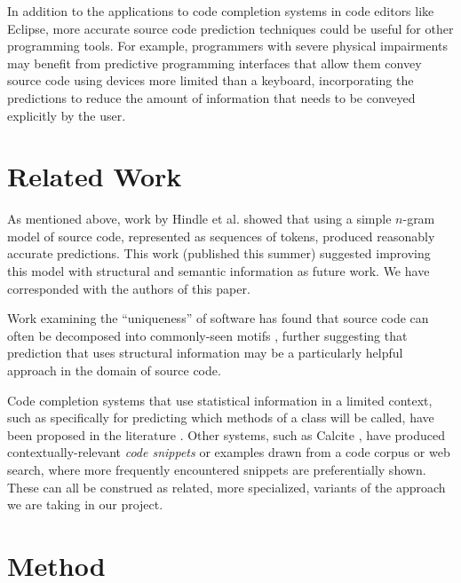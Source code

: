 \documentclass{article} %
\begin{document}
In addition to the applications to code completion systems in code editors like Eclipse, more accurate source code prediction techniques could be useful for other programming tools. For example, programmers with severe physical impairments may benefit from predictive programming interfaces that allow them convey source code using devices more limited than a keyboard, incorporating the predictions to reduce the amount of information that needs to be conveyed explicitly by the user.

\section*{Related Work}
As mentioned above, work by Hindle et al. \cite{Hindle:2012:NS:2337223.2337322} showed that using a simple $n$-gram model of source code, represented as sequences of tokens, produced reasonably accurate predictions. This work (published this summer) suggested improving this model with structural and semantic information as future work. We have corresponded with the authors of this paper.

Work examining the ``uniqueness'' of software has found that source code can often be decomposed into commonly-seen motifs \cite{Gabel:2010:FSE}, further suggesting that prediction that uses structural information may be a particularly helpful approach in the domain of source code.

Code completion systems that use statistical information in a limited context, such as specifically for predicting which methods of a class will be called, have been proposed in the literature \cite{Bruch:2009:LEI:1595696.1595728,robbes_how_2008}. Other systems, such as Calcite \cite{mooty_calcite:_2010}, have produced contextually-relevant {\em code snippets} or examples drawn from a code corpus or web search, where more frequently encountered snippets are preferentially shown. These can all be construed as related, more specialized, variants of the approach we are taking in our project.

\section*{Method}
\newcommand{\asgn}{\textbf{assignment}}
\newcommand{\statement}{\textbf{statement}}
\newcommand{\argument}{\textbf{arg}}
\newcommand{\other}{\textbf{other}}

\newcommand{\lit}{\textbf{lit}}
\newcommand{\meth}{\textbf{meth}}
\newcommand{\var}{\textbf{var}}
\end{document}

